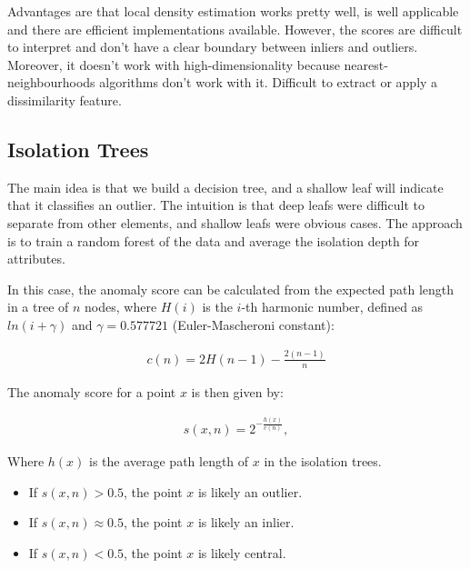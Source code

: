 Advantages are that local density estimation works pretty well, is
well applicable
and there are efficient implementations available. However, the
scores are difficult
to interpret and don't have a clear boundary between inliers and
outliers. Moreover,
it doesn't work with high-dimensionality because
nearest-neighbourhoods algorithms
don't work with it. Difficult to extract or apply a dissimilarity feature.

\subsection{Isolation Trees}

The main idea is that we build a decision tree, and a shallow leaf will indicate
that it classifies an outlier. The intuition is that deep leafs were
difficult to
separate from other elements, and shallow leafs were obvious cases.
The approach is to train a random forest of the data and average the isolation
depth for attributes.

In this case, the anomaly score can be calculated from the expected path length
in a tree of $n$ nodes, where $H(i)$ is the $i$-th harmonic number,
defined as $ln(i + \gamma)$
and $\gamma = 0.577721$ (Euler-Mascheroni constant):

\begin{align*}
  c(n) = 2H(n - 1) - \frac{2(n - 1)}{n}
\end{align*}

The anomaly score for a point $x$ is then given by:

\begin{align*}
  s(x, n) = 2^{-\frac{h(x)}{c(n)}},
\end{align*}

Where $h(x)$ is the average path length of $x$ in the
isolation trees.

\begin{itemize}
  \item If $s(x, n) > 0.5$, the point $x$ is likely an outlier.
  \item If $s(x, n) \approx 0.5$, the point $x$ is likely an inlier.
  \item If $s(x, n) < 0.5$, the point $x$ is likely central.
\end{itemize}

